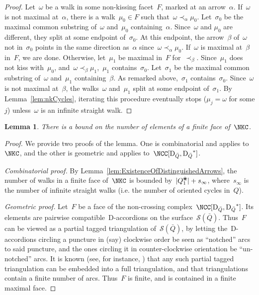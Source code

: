 \documentclass{amsart}
\newtheorem{lemma}[theorem]{Lemma}
\theoremstyle{definition}
\newcommand{\para}[1]{\medskip\noindent\textit{#1.}} %
\newcommand{\blossom}{^\text{\ding{96}}} %
\newcommand{\surface}{\mathcal{S}} %
\newcommand{\dual}{^*} %
\newcommand{\dissection}{\mathrm{D}} %
\begin{document}
\begin{proof}
Let~$\omega$ be a walk in some non-kissing facet~$F$, marked at an arrow~$\alpha$.
If~$\omega$ is not maximal at~$\alpha$, there is a walk~$\mu_0\in F$ such that~$\omega\prec_\alpha \mu_0$.
Let~$\sigma_0$ be the maximal common substring of~$\omega$ and~$\mu_0$ containing~$\alpha$.
Since~$\omega$ and $\mu_0$ are different, they split at some endpoint of~$\sigma_0$.
At this endpoint, the arrow~$\beta$ of~$\omega$ not in~$\sigma_0$ points in the same direction as~$\alpha$ since~$\omega \prec_\alpha \mu_0$.
If~$\omega$ is maximal at~$\beta$ in~$F$, we are done.
Otherwise, let~$\mu_1$ be maximal in~$F$ for~$\prec_\beta$.
Since~$\mu_1$ does not kiss with~$\mu_0$, and~$\omega\prec_\beta\mu_1$,~$\mu_1$ contains~$\sigma_0$.
Let~$\sigma_1$ be the maximal common substring of~$\omega$ and~$\mu_1$ containing~$\beta$.
As remarked above,~$\sigma_1$ contains~$\sigma_0$.
Since~$\omega$ is not maximal at~$\beta$, the walks~$\omega$ and~$\mu_1$ split at some endpoint of~$\sigma_1$.
By Lemma~\ref{lem:nkCycles}, iterating this procedure eventually stops ($\mu_j=\omega$ for some $j$) unless~$\omega$ is an infinite straight walk.
\end{proof}

\begin{lemma}
\label{lemm:facesAreBounded}
There is a bound on the number of elements of a finite face of~$\NKC$.
\end{lemma}
\begin{proof}
 We provide two proofs of the lemma.
 One is combinatorial and applies to~$\NKC$, and the other is geometric and applies to~$\NCC[\dissection_{\bar Q}, {\dissection_{\bar Q}}\dual]$.
 
 \para{Combinatorial proof}
 By Lemma~\ref{lem:ExistenceOfDistinguishedArrows}, the number of walks in a finite face of~$\NKC$ is bounded by~$|Q_1\blossom|+s_\infty$, where~$s_\infty$ is the number of infinite straight walks (i.e. the number of oriented cycles in~$Q$).

 \para{Geometric proof}
 Let~$F$ be a face of the non-crossing complex~$\NCC[\dissection_{\bar Q}, {\dissection_{\bar Q}}\dual]$.
 Its elements are pairwise compatible~$\dissection$-accordions on the surface~$\surface(\bar Q)$.
 Thus~$F$ can be viewed as a partial tagged triangulation of~$\surface(\bar Q)$, by letting the~$\dissection$-accordions circling a puncture in (say) clockwise order be seen as ``notched'' arcs to said puncture, and the ones circling it in counter-clockwise orientation be ``un-notched'' arcs.
 It is known (see, for instance, \cite{FominShapiroThurston}) that any such partial tagged triangulation can be embedded into a full triangulation, and that triangulations contain a finite number of arcs.
 Thus~$F$ is finite, and is contained in a finite maximal face.
\end{proof}
\end{document}
